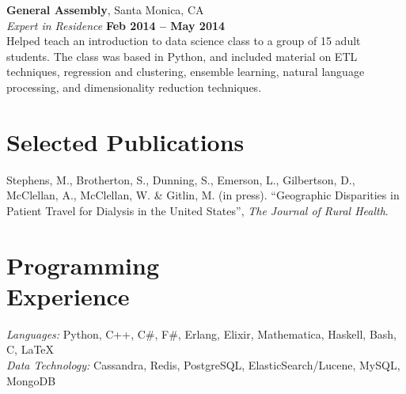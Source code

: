 \documentclass[margin,line]{resume}
\begin{document}
\begin{resume}
    \textbf{General Assembly}, Santa Monica, CA \vspace{2mm}\\\vspace{1mm}%
    \textsl{Expert in Residence} \hfill \textbf{Feb 2014 -- May 2014}\\
     Helped teach an introduction to data science class to a group of 15 adult students. The class was based in Python, and included material on ETL techniques, regression and clustering, ensemble learning, natural language processing, and dimensionality reduction techniques.


   \section{\mysidestyle Selected Publications}
    Stephens, M., Brotherton, S., Dunning, S., Emerson, L., Gilbertson, D., McClellan, A., McClellan, W. \& Gitlin, M. (in press). ``Geographic Disparities in Patient Travel for Dialysis in the United States'', \textsl{The Journal of Rural Health}.
\vspace{-2mm}

    \section{\mysidestyle Programming\\Experience}

    \emph{Languages:} Python, C++, C\#, F\#, Erlang, Elixir, Mathematica, Haskell, Bash, C, \LaTeX \\
    \emph{Data Technology:} Cassandra, Redis, PostgreSQL, ElasticSearch/Lucene, MySQL, MongoDB
\end{resume}
\end{document}
